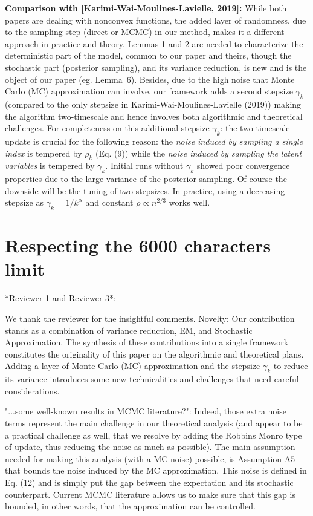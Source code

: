\documentclass[anon,12pt]{alt2021} %
\begin{document}
\textbf{Comparison with [Karimi-Wai-Moulines-Lavielle, 2019]:} 
While both papers are dealing with nonconvex functions, the added layer of randomness, due to the sampling step (direct or MCMC) in our method, makes it a different approach in practice and theory.
Lemmas 1 and 2 are needed to characterize the deterministic part of the model, common to our paper and theirs, though the stochastic part (posterior sampling), and its variance reduction, is new and is the object of our paper (eg. Lemma~6).
Besides, due to the high noise that Monte Carlo (MC) approximation can involve, our framework adds a second stepsize $\gamma_k$ (compared to the only stepsize in Karimi-Wai-Moulines-Lavielle (2019)) making the algorithm two-timescale and hence involves both algorithmic and theoretical challenges. 
For completeness on this additional stepsize  $\gamma_k$: the two-timescale update is crucial for the following reason: the \emph{noise induced by sampling a single index} is tempered by $\rho_k$ (Eq. (9)) while the \emph{noise induced by sampling the latent variables} is tempered by $\gamma_k$. 
Initial runs without $\gamma_k$ showed poor convergence properties due to the large variance of the posterior sampling.
Of course the downside will be the tuning of two stepsizes. 
In practice, using a decreasing stepsize as $\gamma_k = 1/k^{\alpha}$ and constant $\rho \propto n^{2/3}$ works well.



\section{Respecting the 6000 characters limit}

*Reviewer 1 and Reviewer 3*: 

We thank the reviewer for the insightful comments.
Novelty: Our contribution stands as a combination of variance reduction, EM, and Stochastic Approximation. 
The synthesis of these contributions into a single framework constitutes the originality of this paper on the algorithmic and theoretical plans.
Adding a layer of Monte Carlo (MC) approximation and the stepsize $\gamma_k$ to reduce its variance introduces some new technicalities and challenges that need careful considerations.

"...some well-known results in MCMC literature?": Indeed, those extra noise terms represent the main challenge in our theoretical analysis (and appear to be a practical challenge as well, that we resolve by adding the Robbins Monro type of update, thus reducing the noise as much as possible). The main assumption needed for making this analysis (with a MC noise) possible, is Assumption A5 that bounds the noise induced by the MC approximation. This noise is defined in Eq. (12) and is simply put the gap between the expectation and its stochastic counterpart. Current MCMC literature allows us to make sure that this gap is bounded, in other words, that the approximation can be controlled.
\end{document}
